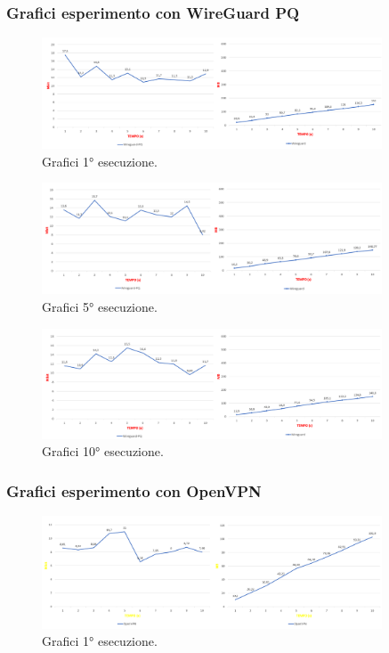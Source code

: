 \newpage
\subsubsection{Grafici esperimento con WireGuard PQ}

\begin{figure}[h] \includegraphics[width=0.9\textwidth] {Tesi magistrale/capitoli/images/20.png}
\centering
\caption{Grafici 1° esecuzione.}
\end{figure}

\begin{figure}[h] \includegraphics[width=0.9\textwidth] {Tesi magistrale/capitoli/images/21.png}
\centering
\caption{Grafici 5° esecuzione.}
\end{figure}

\begin{figure}[h] \includegraphics[width=0.9\textwidth] {Tesi magistrale/capitoli/images/22.png}
\centering
\caption{Grafici 10° esecuzione.}
\end{figure}

\newpage
\subsubsection{Grafici esperimento con OpenVPN}

\begin{figure}[h] \includegraphics[width=0.9\textwidth] {Tesi magistrale/capitoli/images/23.png}
\centering
\caption{Grafici 1° esecuzione.}
\end{figure}


